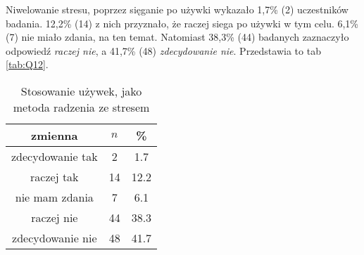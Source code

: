 Niwelowanie stresu, poprzez sięganie po używki wykazało 1,7\% (2) uczestników badania.  12,2\% (14)  z nich przyznało, że raczej siega po używki w tym celu. 6,1\% (7) nie miało zdania, na ten temat. Natomiast  38,3\% (44) badanych zaznaczyło odpowiedź \textit{raczej nie}, a  41,7\% (48) \textit{zdecydowanie nie}. Przedstawia to  tab \ref{tab:Q12}.

\begin{table}[H]
\caption{Stosowanie używek, jako metoda radzenia ze stresem}
\centering
\begin{tabular}{ | c | c | c |}
\hline
zmienna & $n$ & \% \\
\hline
zdecydowanie tak  &  2  & 1.7 \\
\hline
raczej tak  &  14  & 12.2 \\
\hline
nie mam zdania  &  7  & 6.1\\
\hline
raczej nie  &  44  & 38.3 \\
\hline
zdecydowanie nie  &  48  & 41.7 \\
\hline
\end{tabular}
\label{tab:Q13}
\end{table}
